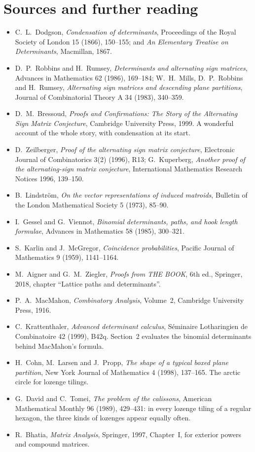 \section*{Sources and further reading}

\begin{itemize}
\item C.~L.~Dodgson, \emph{Condensation of determinants}, Proceedings of the Royal Society of London 15 (1866), 150--155;
and \emph{An Elementary Treatise on Determinants}, Macmillan, 1867.
\item D.~P.~Robbins and H.~Rumsey, \emph{Determinants and alternating sign matrices}, Advances in Mathematics 62 (1986),
169--184; W.~H.~Mills, D.~P.~Robbins and H.~Rumsey, \emph{Alternating sign matrices and descending plane partitions},
Journal of Combinatorial Theory A 34 (1983), 340--359.
\item D.~M.~Bressoud, \emph{Proofs and Confirmations: The Story of the Alternating Sign Matrix Conjecture}, Cambridge
University Press, 1999. A wonderful account of the whole story, with condensation at its start.
\item D.~Zeilberger, \emph{Proof of the alternating sign matrix conjecture}, Electronic Journal of Combinatorics 3(2)
(1996), R13; G.~Kuperberg, \emph{Another proof of the alternating-sign matrix conjecture}, International Mathematics
Research Notices 1996, 139--150.
\item B.~Lindstr\"om, \emph{On the vector representations of induced matroids}, Bulletin of the London Mathematical
Society 5 (1973), 85--90.
\item I.~Gessel and G.~Viennot, \emph{Binomial determinants, paths, and hook length formulae}, Advances in Mathematics 58
(1985), 300--321.
\item S.~Karlin and J.~McGregor, \emph{Coincidence probabilities}, Pacific Journal of Mathematics 9 (1959), 1141--1164.
\item M.~Aigner and G.~M.~Ziegler, \emph{Proofs from THE BOOK}, 6th ed., Springer, 2018, chapter ``Lattice paths and
determinants''.
\item P.~A.~MacMahon, \emph{Combinatory Analysis}, Volume~2, Cambridge University Press, 1916.
\item C.~Krattenthaler, \emph{Advanced determinant calculus}, S\'eminaire Lotharingien de Combinatoire 42 (1999), B42q.
Section~2 evaluates the binomial determinants behind MacMahon's formula.
\item H.~Cohn, M.~Larsen and J.~Propp, \emph{The shape of a typical boxed plane partition}, New York Journal of Mathematics
4 (1998), 137--165. The arctic circle for lozenge tilings.
\item G.~David and C.~Tomei, \emph{The problem of the calissons}, American Mathematical Monthly 96 (1989), 429--431: in
every lozenge tiling of a regular hexagon, the three kinds of lozenges appear equally often.
\item R.~Bhatia, \emph{Matrix Analysis}, Springer, 1997, Chapter~I, for exterior powers and compound matrices.
\end{itemize}
